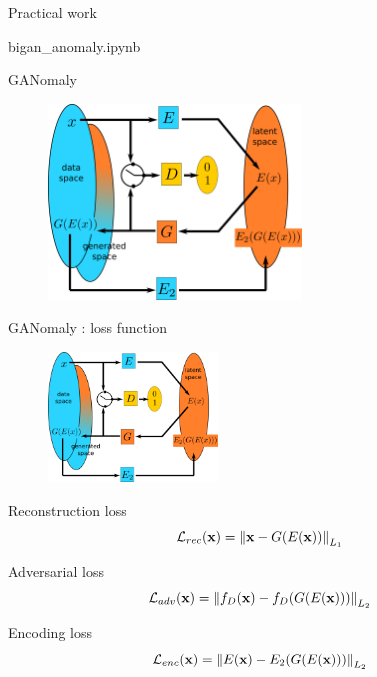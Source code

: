 \documentclass[xcolor=pdftex,dvipsnames,table,mathserif]{beamer}
\begin{document}
\begin{frame}{Practical work}

\begin{alertblock}{}
  bigan\_anomaly.ipynb
\end{alertblock}

\end{frame}



\begin{frame}{GANomaly \cite{akcay_ganomaly:_2019}}

  \begin{figure}[ht]
    \centering
    \includegraphics[width=0.6\textwidth]{ganomaly}
  \end{figure}



\end{frame}

\begin{frame}{GANomaly : loss function}

  \begin{figure}[ht]
    \centering
    \includegraphics[width=0.4\textwidth]{ganomaly}
  \end{figure}

\small

  \begin{block}{Reconstruction loss}
    \[ \mathcal{L}_{rec}(\mathbf{x}) = \norm{\mathbf{x} - G(E(\mathbf{x}))}_{L_1} \]
  \end{block}

  \begin{block}{Adversarial loss}
    \[ \mathcal{L}_{adv}(\mathbf{x}) = \norm{f_D(\mathbf{x}) - f_D(G(E(\mathbf{x})))}_{L_2} \]
  \end{block}

  \begin{block}{Encoding loss}
    \[ \mathcal{L}_{enc}(\mathbf{x}) = \norm{E(\mathbf{x}) - E_2(G(E(\mathbf{x})))}_{L_2} \]
  \end{block}

\end{frame}
\end{document}

